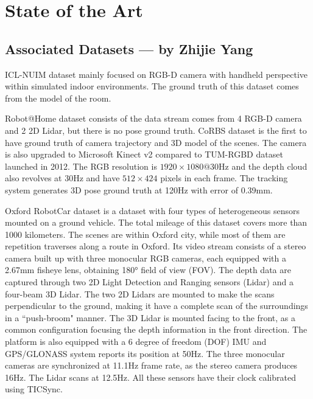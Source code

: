 \documentclass[conference]{IEEEtran}
\begin{document}
\section{State of the Art}

\subsection{Associated Datasets --- by Zhijie Yang}
ICL-NUIM dataset \cite{ICL-NUIM} mainly focused on RGB-D camera with handheld perspective within simulated indoor environments. The ground truth of this dataset comes from the model of the room. 

Robot@Home dataset \cite{Robot@Home} consists of the data stream comes from 4 RGB-D camera and 2 2D Lidar, but there is no pose ground truth. %
CoRBS dataset\cite{CoRBS} is the first to have ground truth of camera trajectory and 3D model of the scenes. The camera is also upgraded to Microsoft Kinect v2 compared to TUM-RGBD dataset launched in 2012. The RGB resolution is $1920\times 1080@$30Hz and the depth cloud also revolves at 30Hz and have $512\times 424$ pixels in each frame. The tracking system generates 3D pose ground truth at 120Hz with error of 0.39mm.

Oxford RobotCar dataset\cite{RobotCar} is a dataset with four types of heterogeneous sensors mounted on a ground vehicle. The total mileage of this dataset covers more than 1000 kilometers. The scenes are within Oxford city, while most of them are repetition traverses along a route in Oxford. Its video stream consists of a stereo camera built up with three monocular RGB cameras, each equipped with a 2.67mm fisheye lens, obtaining \ang{180} field of view (FOV). The depth data are captured through two 2D Light Detection and Ranging sensors (Lidar) and a four-beam 3D Lidar. The two 2D Lidars are mounted to make the scans perpendicular to the ground, making it have a complete scan of the surroundings in a ``push-broom" manner. The 3D Lidar is mounted facing to the front, as a common configuration focusing the depth information in the front direction. The platform is also equipped with a 6 degree of freedom (DOF) IMU and GPS/GLONASS system reports its position at 50Hz. The three monocular cameras are synchronized at 11.1Hz frame rate, as the stereo camera produces 16Hz. The Lidar scans at 12.5Hz. All these sensors have their clock calibrated using TICSync. 
\end{document}
